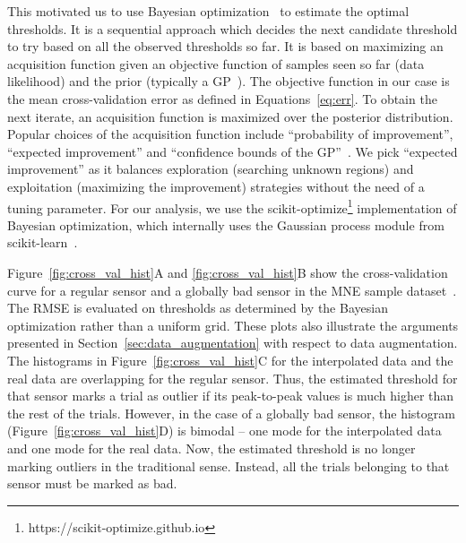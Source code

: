 This motivated us to use Bayesian optimization~\citep{snoek2012practical, bergstra2011algorithms} to estimate the optimal thresholds. It is a sequential approach which decides the next candidate threshold to try based on all the observed thresholds so far. It is based on maximizing an acquisition function given an objective function of samples seen so far (data likelihood) and the prior (typically a \ac{GP}~\citep{rasmussen2006gaussian}). The objective function in our case is the mean cross-validation error as defined in Equations~\eqref{eq:err}. To obtain the next iterate, an acquisition function is maximized over the posterior distribution. Popular choices of the acquisition function include ``probability of improvement'', ``expected improvement'' and ``confidence bounds of the \ac{GP}''~\citep{snoek2012practical}. We pick ``expected improvement'' as it balances exploration (searching unknown regions) and exploitation (maximizing the improvement) strategies without the need of a tuning parameter. For our analysis, we use the scikit-optimize\footnote{https://scikit-optimize.github.io} implementation of Bayesian optimization, which internally uses the Gaussian process module from scikit-learn~\citep{scikit-learn}.

Figure~\ref{fig:cross_val_hist}A and \ref{fig:cross_val_hist}B show the cross-validation curve for a regular sensor and a globally bad sensor in the MNE sample dataset~\citep{mne,gramfort2013meg}. The RMSE is evaluated on thresholds as determined by the Bayesian optimization rather than a uniform grid. These plots also illustrate the arguments presented in Section~\ref{sec:data_augmentation} with respect to data augmentation. The histograms in Figure~\ref{fig:cross_val_hist}C for the interpolated data and the real data are overlapping for the regular sensor. Thus, the estimated threshold for that sensor marks a trial as outlier if its peak-to-peak values is much higher than the rest of the trials. However, in the case of a globally bad sensor, the histogram (Figure~\ref{fig:cross_val_hist}D) is bimodal -- one mode for the interpolated data and one mode for the real data. Now, the estimated threshold is no longer marking outliers in the traditional sense. Instead, all the trials belonging to that sensor must be marked as bad.
